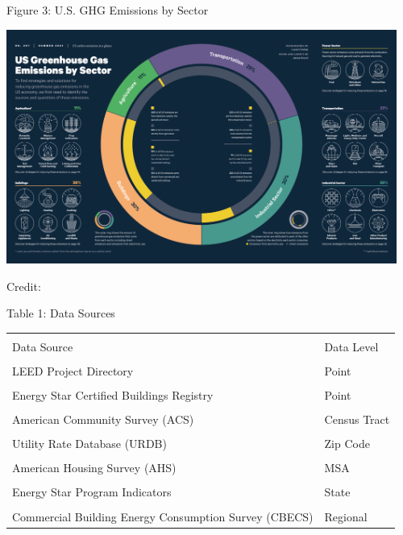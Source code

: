 \documentclass[11pt]{beamer}
\begin{document}
\begin{frame}{Figure 3: U.S. GHG Emissions by Sector}
\begin{adjustwidth}{-1cm}{-1cm}
\href{https://media.rff.org/documents/RFF-Resources-magazine-issue-207.pdf}{\includegraphics[width=128mm]{rff.png}}
\end{adjustwidth}
Credit: \cite{rfftoolkit}
\end{frame}


\begin{frame}{Table 1: Data Sources}
\centering
\begin{tabular}{>{\raggedright\arraybackslash}p{} >{\raggedright\arraybackslash}p{}}
\hline \hline\\ [-1.8ex]
Data Source & Data Level\\
\hline \\ [-1.8ex]
LEED Project Directory & Point \\ \\[-1.8ex]
Energy Star Certified Buildings Registry & Point  \\ \\[-1.8ex]
American Community Survey (ACS) & Census Tract \\ \\[-1.8ex]
Utility Rate Database (URDB) & Zip Code \\ \\[-1.8ex]
American Housing Survey (AHS) & MSA\\ \\[-1.8ex]
Energy Star Program Indicators & State \\ \\[-1.8ex]
Commercial Building Energy Consumption Survey (CBECS) & Regional\\
\hline \hline
\end{tabular}
\end{frame}
\end{document}
